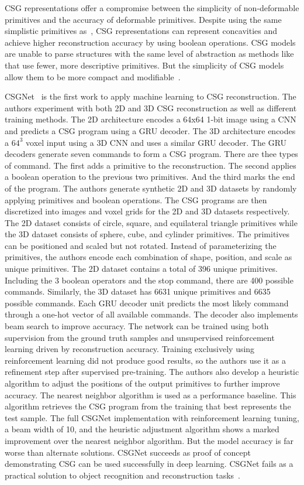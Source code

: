 CSG representations offer a compromise between the simplicity of non-deformable primitives and the accuracy of deformable primitives. Despite using the same simplistic primitives as~\cite{Li2019}, CSG representations can represent concavities and achieve higher reconstruction accuracy by using boolean operations. CSG models are unable to parse structures with the same level of abstraction as methods like~\cite{Paschalidou2021} that use fewer, more descriptive primitives. But the simplicity of CSG models allow them to be more compact and modifiable~\cite{Paschalidou2021}.

CSGNet~\cite{Sharma2018} is the first work to apply machine learning to CSG reconstruction. The authors experiment with both 2D and 3D CSG reconstruction as well as different training methods. The 2D architecture encodes a 64x64 1-bit image using a CNN and predicts a CSG program using a GRU decoder. The 3D architecture encodes a $64^3$ voxel input using a 3D CNN and uses a similar GRU decoder. The GRU decoders generate seven commands to form a CSG program. There are thee types of command. The first adds a primitive to the reconstruction. The second applies a boolean operation to the previous two primitives. And the third marks the end of the program. The authors generate synthetic 2D and 3D datasets by randomly applying primitives and boolean operations. The CSG programs are then discretized into images and voxel grids for the 2D and 3D datasets respectively. The 2D dataset consists of circle, square, and equilateral triangle primitives while the 3D dataset consists of sphere, cube, and cylinder primitives. The primitives can be positioned and scaled but not rotated. Instead of parameterizing the primitives, the authors encode each combination of shape, position, and scale as unique primitives. The 2D dataset contains a total of 396 unique primitives. Including the 3 boolean operators and the stop command, there are 400 possible commands. Similarly, the 3D dataset has 6631 unique primitives and 6635 possible commands. Each GRU decoder unit predicts the most likely command through a one-hot vector of all available commands. The decoder also implements beam search to improve accuracy. The network can be trained using both supervision from the ground truth samples and unsupervised reinforcement learning driven by reconstruction accuracy. Training exclusively using reinforcement learning did not produce good results, so the authors use it as a refinement step after supervised pre-training. The authors also develop a heuristic algorithm to adjust the positions of the output primitives to further improve accuracy. The nearest neighbor algorithm is used as a performance baseline. This algorithm retrieves the CSG program from the training that best represents the test sample. The full CSGNet implementation with reinforcement learning tuning, a beam width of 10, and the heuristic adjustment algorithm shows a marked improvement over the nearest neighbor algorithm. But the model accuracy is far worse than alternate solutions. CSGNet succeeds as proof of concept demonstrating CSG can be used successfully in deep learning. CSGNet fails as a practical solution to object recognition and reconstruction tasks~\cite{Sharma2018}.

